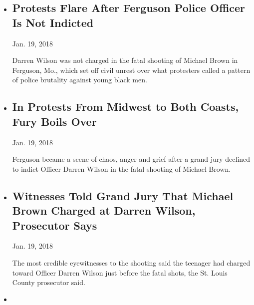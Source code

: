 \begin{itemize}
\item
  \href{https://www.nytimes.com/2014/11/25/us/ferguson-darren-wilson-shooting-michael-brown-grand-jury.html}{}

  \hypertarget{protests-flare-after-ferguson-police-officer-is-not-indicted}{%
  \subsection{Protests Flare After Ferguson Police Officer Is Not
  Indicted}\label{protests-flare-after-ferguson-police-officer-is-not-indicted}}

  Jan. 19, 2018

  Darren Wilson was not charged in the fatal shooting of Michael Brown
  in Ferguson, Mo., which set off civil unrest over what protesters
  called a pattern of police brutality against young black men.
\item
  \href{https://www.nytimes.com/2014/11/25/us/frustration-months-in-the-making-boils-over-on-the-streets-of-ferguson.html}{}

  \hypertarget{in-protests-from-midwest-to-both-coasts-fury-boils-over}{%
  \subsection{In Protests From Midwest to Both Coasts, Fury Boils
  Over}\label{in-protests-from-midwest-to-both-coasts-fury-boils-over}}

  Jan. 19, 2018

  Ferguson became a scene of chaos, anger and grief after a grand jury
  declined to indict Officer Darren Wilson in the fatal shooting of
  Michael Brown.
\item
  \href{https://www.nytimes.com/2014/11/25/us/witnesses-told-grand-jury-that-michael-brown-charged-at-darren-wilson-prosecutor-says.html}{}

  \hypertarget{witnesses-told-grand-jury-that-michael-brown-charged-at-darren-wilson-prosecutor-says}{%
  \subsection{Witnesses Told Grand Jury That Michael Brown Charged at
  Darren Wilson, Prosecutor
  Says}\label{witnesses-told-grand-jury-that-michael-brown-charged-at-darren-wilson-prosecutor-says}}

  Jan. 19, 2018

  The most credible eyewitnesses to the shooting said the teenager had
  charged toward Officer Darren Wilson just before the fatal shots, the
  St. Louis County prosecutor said.
\item
  \href{https://www.nytimes.com/interactive/2014/11/09/us/10ferguson-michael-brown-shooting-grand-jury-darren-wilson.html}{}


\end{itemize}
